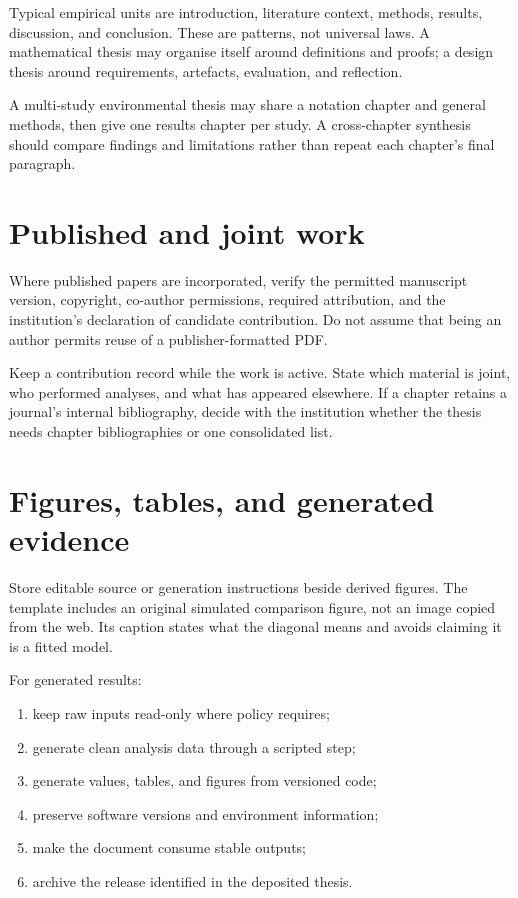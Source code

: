 Typical empirical units are introduction, literature context, methods,
results, discussion, and conclusion. These are patterns, not universal laws.
A mathematical thesis may organise itself around definitions and proofs; a
design thesis around requirements, artefacts, evaluation, and reflection.

\begin{scienceinpractice}
A multi-study environmental thesis may share a notation chapter and general
methods, then give one results chapter per study. A cross-chapter synthesis
should compare findings and limitations rather than repeat each chapter's final
paragraph.
\end{scienceinpractice}

\section{Published and joint work}

Where published papers are incorporated, verify the permitted manuscript
version, copyright, co-author permissions, required attribution, and the
institution's declaration of candidate contribution. Do not assume that being
an author permits reuse of a publisher-formatted PDF.

Keep a contribution record while the work is active. State which material is
joint, who performed analyses, and what has appeared elsewhere. If a chapter
retains a journal's internal bibliography, decide with the institution whether
the thesis needs chapter bibliographies or one consolidated list.

\section{Figures, tables, and generated evidence}

Store editable source or generation instructions beside derived figures. The
template includes an original simulated comparison figure, not an image copied
from the web. Its caption states what the diagonal means and avoids claiming it
is a fitted model.

For generated results:

\begin{enumerate}
  \item keep raw inputs read-only where policy requires;
  \item generate clean analysis data through a scripted step;
  \item generate values, tables, and figures from versioned code;
  \item preserve software versions and environment information;
  \item make the document consume stable outputs;
  \item archive the release identified in the deposited thesis.
\end{enumerate}

